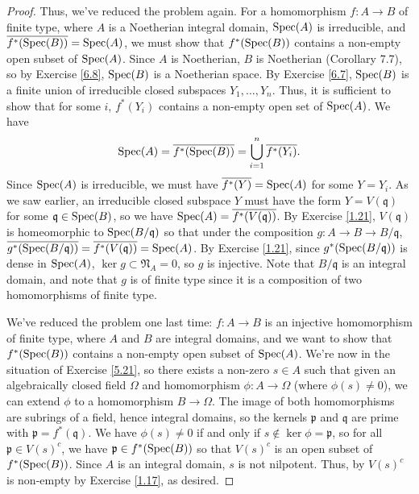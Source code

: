\begin{proof}
Thus, we've reduced the problem again. For a homomorphism $f : A \to B$ of finite type, where $A$ is a Noetherian integral domain, $\operatorname{Spec}(A)$ is irreducible, and 
$\overline{f^*(\operatorname{Spec}(B))} = \operatorname{Spec}(A)$, we must show that $f^*(\operatorname{Spec}(B))$ contains a non-empty open subset of $\operatorname{Spec}(A)$. Since $A$ is Noetherian, $B$ is Noetherian 
(Corollary 7.7), so by Exercise \ref{6.8}, $\operatorname{Spec}(B)$ is a Noetherian space. By Exercise \ref{6.7}, $\operatorname{Spec}(B)$ is a finite union of irreducible closed subspaces 
$Y_1,\ldots,Y_n$. Thus, it is sufficient to show that for some $i$, $f^*(Y_i)$ contains a non-empty open set of $\operatorname{Spec}(A)$. We have
$$\operatorname{Spec}(A) = \overline{f^*(\operatorname{Spec}(B))} = \bigcup_{i=1}^n \overline{f^*(Y_i)}.$$
Since $\operatorname{Spec}(A)$ is irreducible, we must have $\overline{f^*(Y)} = \operatorname{Spec}(A)$ for some $Y = Y_i$. As we saw earlier, an irreducible closed subspace $Y$ must have the
form $Y = V(\mathfrak{q})$ for some $\mathfrak{q} \in \operatorname{Spec}(B)$, so we have $\operatorname{Spec}(A) = \overline{f^*(V(\mathfrak{q}))}$. By Exercise \ref{1.21}, $V(\mathfrak{q})$
is homeomorphic to $\operatorname{Spec}(B/\mathfrak{q})$ so that under the composition $g : A \to B \to B/\mathfrak{q}$, 
$\overline{g^*(\operatorname{Spec}(B/\mathfrak{q}))} = \overline{f^*(V(\mathfrak{q}))} = \operatorname{Spec}(A)$. By Exercise \ref{1.21}, since $g^*(\operatorname{Spec}(B/\mathfrak{q}))$ is dense in $\operatorname{Spec}(A)$,
$\ker g \subset \mathfrak{N}_A = 0$, so $g$ is injective. Note that $B/\mathfrak{q}$ is an integral domain, and note that $g$ is of finite type since it is a composition 
of two homomorphisms of finite type.

We've reduced the problem one last time: $f : A \to B$ is an injective homomorphism of finite type, where $A$ and $B$ are integral domains, and we want to show that
$f^*(\operatorname{Spec}(B))$ contains a non-empty open subset of $\operatorname{Spec}(A)$. We're now in the situation of Exercise \ref{5.21}, so there exists a non-zero $s \in A$ such that
given an algebraically closed field $\Omega$ and homomorphism $\phi : A \to \Omega$ (where $\phi(s) \neq 0$), we can extend $\phi$ to a homomorphism $B \to \Omega$.
The image of both homomorphisms are subrings of a field, hence integral domains, so the kernels $\mathfrak{p}$ and $\mathfrak{q}$ are prime with 
$\mathfrak{p} = f^*(\mathfrak{q})$. We have $\phi(s) \neq 0$ if and only if $s \not\in \ker \phi = \mathfrak{p}$, so for all $\mathfrak{p} \in V(s)^c$, we have
$\mathfrak{p} \in f^*(\operatorname{Spec}(B))$ so that $V(s)^c$ is an open subset of $f^*(\operatorname{Spec}(B))$. Since $A$ is an integral domain, $s$ is not nilpotent. Thus, by $V(s)^c$
is non-empty by Exercise \ref{1.17}, as desired.
\end{proof}


